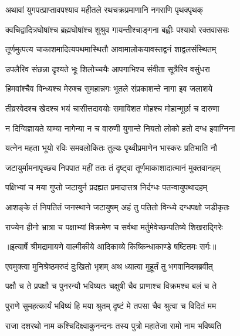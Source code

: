\twolineshloka
{अथावां युगपत्प्राप्तावपश्याव महीतले}
{रथचक्रप्रमाणानि नगराणि पृथक्पृथक्} %

\twolineshloka
{क्वचिद्वादित्रघोषांश्च ब्रह्मघोषांश्च शुश्रुव}
{गायन्तीश्चाङ्गना बह्वीः पश्यावो रक्तवाससः} %

\twolineshloka
{तूर्णमुत्पत्य चाकाशमादित्यपथमास्थितौ}
{आवामालोकयावस्तद्वनं शाद्वलसंस्थितम्} %

\twolineshloka
{उपलैरिव संछन्ना दृश्यते भूः शिलोच्चयैः}
{आपगाभिश्च संवीता सूत्रैरिव वसुंधरा} %

\twolineshloka
{हिमवांश्चैव विन्ध्यश्च मेरुश्च सुमहान्नगः}
{भूतले संप्रकाशन्ते नागा इव जलाशये} %

\twolineshloka
{तीव्रस्वेदश्च खेदश्च भयं चासीत्तदावयोः}
{समाविशत मोहश्च मोहान्मूर्छा च दारुणा} %

\twolineshloka
{न दिग्विज्ञायते याम्या नागेन्या न च वारुणी}
{युगान्ते नियतो लोको हतो दग्ध इवाग्निना} %

\twolineshloka
{यत्नेन महता भूयो रविः समवलोकितः}
{तुल्यः पृथ्वीप्रमाणेन भास्करः प्रतिभाति नौ} %

\twolineshloka
{जटायुर्मामनापृच्छ्य निपपात महीं ततः}
{तं दृष्ट्वा तूर्णमाकाशादात्मानं मुक्तवानहम्} %

\twolineshloka
{पक्षिभ्यां च मया गुप्तो जटायुर्न प्रदह्यत}
{प्रमादात्तत्र निर्दग्धः पतन्वायुपथादहम्} %

\twolineshloka
{आशङ्के तं निपतितं जनस्थाने जटायुषम्}
{अहं तु पतितो विन्ध्ये दग्धपक्षो जडीकृतः} %

\twolineshloka
{राज्येन हीनो भ्रात्रा च पक्षाभ्यां विक्रमेण च}
{सर्वथा मर्तुमेवेच्छन्पतिष्ये शिखराद्गिरेः} %


{॥इत्यार्षे श्रीमद्रामायणे वाल्मीकीये आदिकाव्ये किष्किन्धाकाण्डे षष्टितमः सर्गः॥}


\twolineshloka
{एवमुक्त्वा मुनिश्रेष्ठमरुदं दुःखितो भृशम्}
{अथ ध्यात्वा मुहूर्तं तु भगवानिदमब्रवीत्} %

\twolineshloka
{पक्षौ च ते प्रपक्षौ च पुनरन्यौ भविष्यतः}
{चक्षुषी चैव प्राणाश्च विक्रमश्च बलं च ते} %

\twolineshloka
{पुराणे सुमहत्कार्यं भविष्यं हि मया श्रुतम्}
{दृष्टं मे तपसा चैव श्रुत्वा च विदितं मम} %

\twolineshloka
{राजा दशरथो नाम कश्चिदिक्ष्वाकुनन्दनः}
{तस्य पुत्रो महातेजा रामो नाम भविष्यति} %

